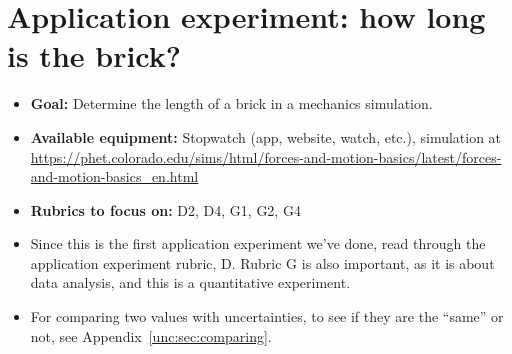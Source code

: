 \section{Application experiment: how long is the brick?}

\begin{itemize}
	\item \textbf{Goal:} Determine the length of a brick in a mechanics simulation.

	\item \textbf{Available equipment:} Stopwatch (app, website, watch, etc.), simulation at \url{https://phet.colorado.edu/sims/html/forces-and-motion-basics/latest/forces-and-motion-basics_en.html}

	\item \textbf{Rubrics to focus on:} D2, D4, G1, G2, G4
	
	\item Since this is the first application experiment we've done, read through the application experiment rubric, D. Rubric G is also important, as it is about data analysis, and this is a quantitative experiment.
	
	\item For comparing two values with uncertainties, to see if they are the ``same'' or not, see Appendix~\ref{unc:sec:comparing}.
\end{itemize}

